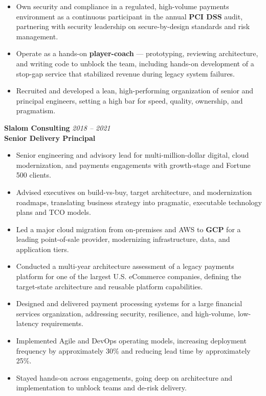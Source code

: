 \documentclass[11pt]{article}
\begin{document}
\begin{itemize}
  \item Own security and compliance in a regulated, high-volume payments environment as a continuous participant in the annual \textbf{PCI DSS} audit, partnering with security leadership on secure-by-design standards and risk management.
  \item Operate as a hands-on \textbf{player-coach} --- prototyping, reviewing architecture, and writing code to unblock the team, including hands-on development of a stop-gap service that stabilized revenue during legacy system failures.
  \item Recruited and developed a lean, high-performing organization of senior and principal engineers, setting a high bar for speed, quality, ownership, and pragmatism.
\end{itemize}

\vspace{6pt}

\pagebreak

\textbf{Slalom Consulting} \hfill \textit{2018 -- 2021} \\
\textbf{Senior Delivery Principal}

\begin{itemize}
  \item Senior engineering and advisory lead for multi-million-dollar digital, cloud modernization, and payments engagements with growth-stage and Fortune 500 clients.
  \item Advised executives on build-vs-buy, target architecture, and modernization roadmaps, translating business strategy into pragmatic, executable technology plans and TCO models.
  \item Led a major cloud migration from on-premises and AWS to \textbf{GCP} for a leading point-of-sale provider, modernizing infrastructure, data, and application tiers.
  \item Conducted a multi-year architecture assessment of a legacy payments platform for one of the largest U.S. eCommerce companies, defining the target-state architecture and reusable platform capabilities.
  \item Designed and delivered payment processing systems for a large financial services organization, addressing security, resilience, and high-volume, low-latency requirements.
  \item Implemented Agile and DevOps operating models, increasing deployment frequency by approximately 30\% and reducing lead time by approximately 25\%.
  \item Stayed hands-on across engagements, going deep on architecture and implementation to unblock teams and de-risk delivery.
\end{itemize}
\end{document}

